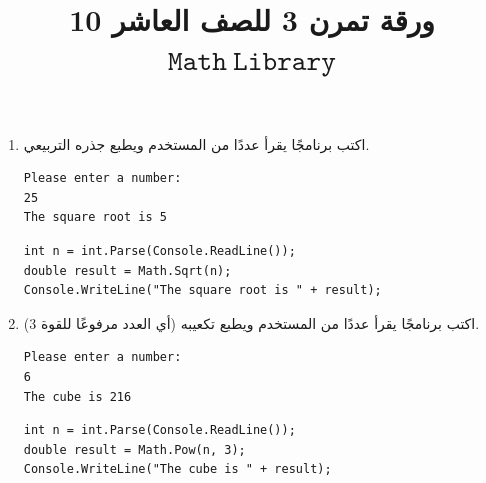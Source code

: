 \documentclass[14pt]{extarticle}
\title{ورقة تمرن 3 للصف العاشر 10 $\mathtt{Math\ Library}$}
\begin{document}
\maketitle
\thispagestyle{fancy}


\begin{enumerate}[itemsep=3em]

    \item
    اكتب برنامجًا يقرأ عددًا من المستخدم ويطبع جذره التربيعي.
    \ifdetailed
    \begin{boxExample}
    \begin{english}
    \begin{verbatim}
Please enter a number:
25
The square root is 5
    \end{verbatim}
    \end{english}
    \end{boxExample}
    \ifwithsols
    \begin{boxSolution}
    \begin{english}
    \begin{verbatim}
int n = int.Parse(Console.ReadLine());
double result = Math.Sqrt(n);
Console.WriteLine("The square root is " + result);
    \end{verbatim}
    \end{english}
    \end{boxSolution}
    \fi
    \fi

    \item
    اكتب برنامجًا يقرأ عددًا من المستخدم ويطبع تكعيبه (أي العدد مرفوعًا للقوة 3).
    \ifdetailed
    \begin{boxExample}
    \begin{english}
    \begin{verbatim}
Please enter a number:
6
The cube is 216
    \end{verbatim}
    \end{english}
    \end{boxExample}
    \ifwithsols
    \begin{boxSolution}
    \begin{english}
    \begin{verbatim}
int n = int.Parse(Console.ReadLine());
double result = Math.Pow(n, 3);
Console.WriteLine("The cube is " + result);
    \end{verbatim}
    \end{english}
    \end{boxSolution}
    \fi
    \fi


\end{enumerate}
\end{document}
